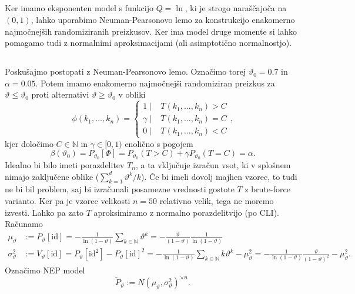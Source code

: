 \documentclass[ letterpaper, titlepage, fleqn]{article}
\newcommand{\N}{\mathbb N}
\newcommand{\id}{\text{id}}
\begin{document}
\subsection{}
Ker imamo eksponenten model s funkcijo $Q = \ln$, ki je strogo naraščajoča na $(0,1)$, lahko uporabimo Neuman-Pearsonovo
lemo za konstrukcijo enakomerno najmočnejših randomiziranih preizkusov. 
Ker ima model druge momente si lahko pomagamo tudi z normalnimi aproksimacijami (ali asimptotično normalnostjo).

\subsection{}
Poskušajmo postopati z Neuman-Pearsonovo lemo. Označimo torej $\vartheta_0 = 0.7$ in $\alpha = 0.05$.
Potem imamo enakomerno najmočnejši randomiziran preizkus za $\vartheta \leq \vartheta_0$ proti alternativi
$\vartheta \ge \vartheta_0$ v obliki
$$
\phi(k_1, \dots, k_n)= 
\begin{cases}
1 \mid & T(k_1, \dots, k_n) > C \\
\gamma \mid &  T(k_1, \dots, k_n) = C \\
0 \mid &  T(k_1, \dots, k_n) < C
\end{cases},
$$
kjer določimo $C \in\N$ in $\gamma \in [0,1)$ enolično s pogojem
$$\beta(\vartheta_0) = P_{\vartheta_0}[\Phi] = P_{\vartheta_0}(T > C) + \gamma P_{\vartheta_0}(T = C) = \alpha.$$
Idealno bi bilo imeti porazdelitev $T_n$, a ta vključuje izračun vsot, ki v splošnem nimajo zaključene oblike ($\sum_{k=1}^d \vartheta^k / k$). Če bi imeli dovolj majhen vzorec, to tudi ne bi bil problem, saj bi izračunali posamezne vrednosti gostote $T$ z brute-force varianto. Ker pa je vzorec velikosti $n=50$ relativno velik, tega ne moremo izvesti. Lahko pa zato $T$ aproksimiramo z normalno porazdelitvijo (po CLI). Računamo
\begin{equation*}
\begin{aligned}
\mu_\vartheta 
&:= P_{\vartheta}[\id] 
= -\frac{1}{\ln(1 - \vartheta)} \sum_{k\in\N} \vartheta^k 
= -\frac{\vartheta}{(1 - \vartheta)} \frac{1}{\ln(1 - \vartheta)} \\
\sigma_\vartheta^2 
&:= V_{\vartheta}[\id] 
= P_{\vartheta}[\id^2] - P_{\vartheta}[\id]^2 
= -\frac{1}{\ln(1 - \vartheta)} \sum_{k\in\N} k\vartheta^k - \mu_\vartheta^2 
= -\frac{1}{\ln(1 - \vartheta)} \frac{\vartheta}{(1-\vartheta)^2} - \mu_\vartheta^2.
\end{aligned}
\end{equation*}
Označimo NEP model
$$\tilde{P}_\vartheta := N(\mu_\vartheta, \sigma_\vartheta^2)^{\times n}.$$
\end{document}
